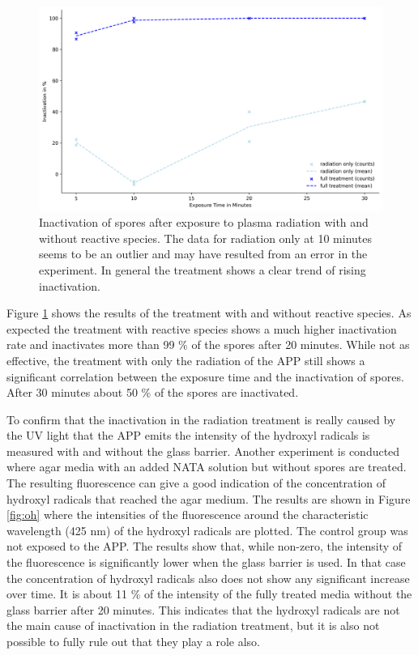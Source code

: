 \begin{figure}
    \centering
    \includegraphics[width=.8\textwidth]{images/Treatment.png}
    \caption[Inactivation of spores after exposure to plasma]{Inactivation of spores after exposure to plasma radiation with and without reactive species. The data for radiation only at 10 minutes seems to be an outlier and may have resulted from an error in the experiment. In general the treatment shows a clear trend of rising inactivation.}
    \label{fig:treatment}
\end{figure}

Figure \ref{fig:treatment} shows the results of the treatment with and without reactive species. As expected the treatment with reactive species shows a much higher inactivation rate and inactivates more than 99 \% of the spores after 20 minutes. While not as effective, the treatment with only the radiation of the APP still shows a significant correlation between the exposure time and the inactivation of spores. After 30 minutes about 50 \% of the spores are inactivated.

To confirm that the inactivation in the radiation treatment is really caused by the UV light that the APP emits the intensity of the hydroxyl radicals is measured with and without the glass barrier. Another experiment is conducted where agar media with an added NATA solution but without spores are treated. The resulting fluorescence can give a good indication of the concentration of hydroxyl radicals that reached the agar medium. The results are shown in Figure \ref{fig:oh} where the intensities of the fluorescence around the characteristic wavelength (425 nm) of the hydroxyl radicals are plotted. The control group was not exposed to the APP. The results show that, while non-zero, the intensity of the fluorescence is significantly lower when the glass barrier is used. In that case the concentration of hydroxyl radicals also does not show any significant increase over time. It is about 11 \% of the intensity of the fully treated media without the glass barrier after 20 minutes. This indicates that the hydroxyl radicals are not the main cause of inactivation in the radiation treatment, but it is also not possible to fully rule out that they play a role also.


